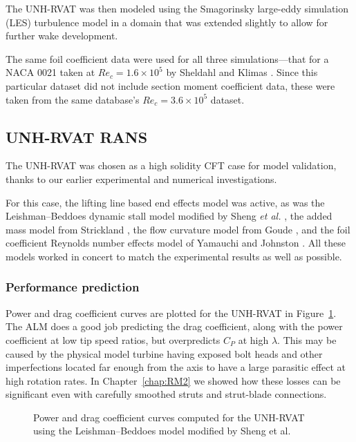 
The UNH-RVAT was then modeled using the Smagorinsky large-eddy simulation (LES)
turbulence model \cite{Smagorinsky1963} in a domain that was extended slightly
to allow for further wake development.

The same foil coefficient data were used for all three simulations---that for a
NACA 0021 taken at $Re_c = 1.6 \times 10^5$ by Sheldahl and Klimas
\cite{Sheldahl1981}. Since this particular dataset did not include section
moment coefficient data, these were taken from the same database's $Re_c = 3.6
\times 10^5$ dataset.


\subsection{UNH-RVAT RANS}

The UNH-RVAT was chosen as a high solidity CFT case for model validation, thanks
to our earlier experimental and numerical investigations.

For this case, the lifting line based end effects model was active, as was the
Leishman--Beddoes dynamic stall model modified by Sheng \emph{et al.}
\cite{Sheng2008}, the added mass model from Strickland \cite{Strickland1981},
the flow curvature model from Goude \cite{Goude2012}, and the foil coefficient
Reynolds number effects model of Yamauchi and Johnston \cite{Yamauchi1983}. All
these models worked in concert to match the experimental results as well as
possible.


\subsubsection{Performance prediction}

Power and drag coefficient curves are plotted for the UNH-RVAT in
Figure~\ref{fig:RVAT-ALM-perf-curves}. The ALM does a good job predicting the
drag coefficient, along with the power coefficient at low tip speed ratios, but
overpredicts $C_P$ at high $\lambda$. This may be caused by the physical model
turbine having exposed bolt heads and other imperfections located far enough
from the axis to have a large parasitic effect at high rotation rates. In
Chapter~\ref{chap:RM2} we showed how these losses can be significant even with
carefully smoothed struts and strut-blade connections.

\begin{figure}
    \caption{Power and drag coefficient curves computed for the UNH-RVAT using
        the Leishman--Beddoes model modified by Sheng et al.}
    
    \label{fig:RVAT-ALM-perf-curves}
\end{figure}


